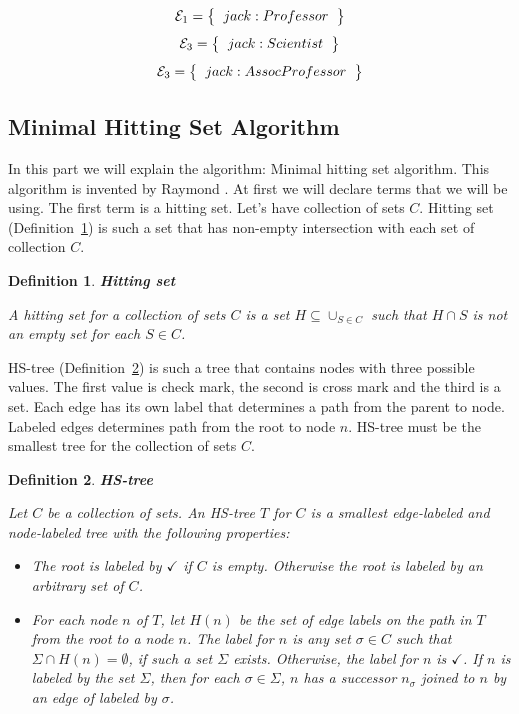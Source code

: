 \documentclass[12pt,a4paper]{article}
\newtheorem{definition}{Definition}[subsection]
\begin{document}
\[ 
\mathcal{E}_{1} = \left\{
\begin{tabular}{c c}
	$jack : Professor$ \\
\end{tabular}
\right \}
\]
\[ 
\mathcal{E}_{3} = \left\{
\begin{tabular}{c c}
	$jack : Scientist$ \\
\end{tabular}
\right \}
\]
\[ 
\mathcal{E}_{3} = \left\{
\begin{tabular}{c c}
	$jack : AssocProfessor$ \\
\end{tabular}
\right \}
\]

\subsection{Minimal Hitting Set Algorithm}
In this part we will explain the algorithm: Minimal hitting set algorithm. This algorithm is invented by Raymond \cite{reiterHS}. At first we will declare terms that we will be using. The first term is a hitting set. Let's have collection of sets $C$. Hitting set (Definition~\ref{def:hittingSet}) is such a set that has non-empty intersection with each set of collection $C$.

\begin{definition}{\textbf{Hitting set}}
	\label{def:hittingSet}
	
	A hitting set for a collection of sets $C$ is a set $H \subseteq \cup_{S \in C}$ such that $H \cap S$ is not an empty set for each $S \in C$.
\end{definition}

HS-tree (Definition~\ref{def:hsTree}) is such a tree that contains nodes with three possible values. The first value is check mark, the second is cross mark and the third is a set. Each edge has its own label that determines a path from the parent to node. Labeled edges determines path from the root to node $n$. HS-tree must be the smallest tree for the collection of sets $C$.

\begin{definition}{\textbf{HS-tree}}
	\label{def:hsTree}
	
	Let $C$ be a collection of sets. An HS-tree $T$ for $C$ is a smallest edge-labeled and node-labeled tree with the following properties:
	
	\begin{itemize}
		\item The root is labeled by $\checkmark$ if $C$ is empty. Otherwise the root is labeled by an arbitrary set of $C$.
		
		\item For each node $n$ of $T$, let $H(n)$ be the set of edge labels on the path in $T$ from the root to a node $n$. The label for $n$ is any set $\sigma \in C$ such that $\Sigma \cap H(n) = \emptyset$, if such a set $\Sigma$ exists. Otherwise, the label for $n$ is $\checkmark$. If $n$ is labeled by the set $\Sigma$, then for each $\sigma \in \Sigma$, $n$ has a successor $n_{\sigma}$ joined to $n$ by an edge of labeled by $\sigma$.
	\end{itemize}
\end{definition}
\end{document}
